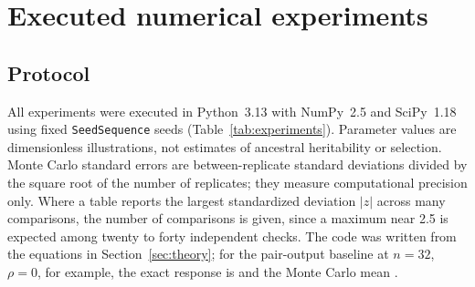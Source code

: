 \section{Executed numerical experiments}\label{sec:experiments}

\subsection{Protocol}

\noindent All experiments were executed in Python~3.13 with NumPy~2.5 and SciPy~1.18 using fixed \texttt{SeedSequence} seeds
(Table~\ref{tab:experiments}). Parameter values are dimensionless illustrations, not estimates of ancestral heritability or
selection. Monte Carlo standard errors are between-replicate standard deviations divided by the square root of the number of
replicates; they measure computational precision only. Where a table reports the largest standardized deviation $|z|$ across
many comparisons, the number of comparisons is given, since a maximum near 2.5 is expected among twenty to forty independent
checks. The code was written from the equations in Section~\ref{sec:theory}; for the pair-output baseline at $n=32$, $\rho=0$,
for example, the exact response is \EOneExact{} and the Monte Carlo mean \EOneMC.

